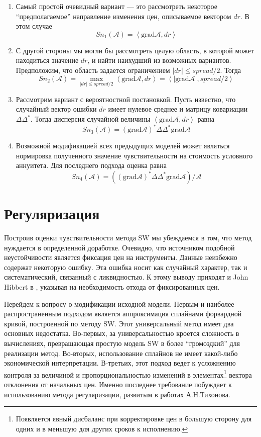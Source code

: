 \documentclass[10pt]{article}
\theoremstyle{definition}
\theoremstyle{remark}
\theoremstyle{plain}
\newcommand{\scalar}[2]{\left<#1,#2\right>}
\begin{document}
\begin{enumerate}

\item Самый простой очевидный вариант --- это рассмотреть некоторое ``предполагаемое'' направление изменения цен, описываемое вектором $dr$. В этом случае
$$
Sn_1(\mathcal{A}) = \scalar{\mathrm{grad}\mathcal{A}}{dr}
$$

\item  С другой стороны мы могли бы рассмотреть целую область, в которой может находиться значение $dr$, и найти наихудший из возможных вариантов. Предположим, что область задается ограничением $|dr|\leqslant spread/2$. Тогда 
$$
Sn_2(\mathcal{A}) = \max\limits_{|dr|\leqslant spread/2}\scalar{\mathrm{grad}\mathcal{A}}{dr} = \scalar{|\mathrm{grad}\mathcal{A}|}{spread/2}
$$

\item Рассмотрим вариант с вероятностной постановкой. Пусть известно, что случайный вектор ошибки $dr$ имеет нулевое среднее и матрицу ковариации $\Delta\Delta^*$. Тогда дисперсия случайной величины $\scalar{\mathrm{grad}\mathcal{A}}{dr}$ равна
$$
Sn_3(\mathcal{A}) = (\mathrm{grad}\mathcal{A})^*\Delta\Delta^*\mathrm{grad}\mathcal{A}
$$
\item Возможной модификацией всех предыдущих моделей может являться нормировка полученного значение чувствительности на стоимость условного аннуитета. Для последнего подхода оценка равна
$$
Sn_4(\mathcal{A}) = \left((\mathrm{grad}\mathcal{A})^*\Delta\Delta^*\mathrm{grad}\mathcal{A}\right) / \mathcal{A}
$$
\end{enumerate}


\newpage
\section{Регуляризация}
Построив оценки чувствительности метода SW мы убеждаемся в том, что метод нуждается в определенной доработке. Очевидно, что источником подобной неустойчивости является фиксация цен на инструменты. Данные неизбежно содержат некоторую ошибку. Эта ошибка носит как случайный характер, так и систематический, связанный с ликвидностью. К этому выводу приходят и John Hibbert в \cite{Hibbert}, указывая на необходимость отхода от фиксированных цен. 

Перейдем к вопросу о модификации исходной модели. Первым и наиболее распространенным подходом является аппроксимация сплайнами форвардной кривой, построенной по методу SW. Этот универсальный метод имеет два основных недостатка. Во-первых, за универсальностью кроется сложность в вычислениях, превращающая простую модель  SW в более ``громоздкий'' для реализации метод. Во-вторых, использование сплайнов не имеет какой-либо экономической интерпретации. В-третьих, этот подход ведет к усложнению контроля за величиной и пропорциональностью изменений в элементах\footnote{Появляется явный дисбаланс при корректировке цен в большую сторону для одних и в меньшую для других сроков к исполнению.} вектора отклонения от начальных цен. Именно последнее требование побуждает к использованию метода регуляризации, развитым в работах А.Н.Тихонова. 
\end{document}
